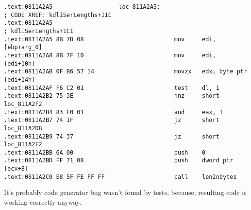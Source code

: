 \documentclass[11pt,a4paper,oneside]{book}
\begin{document}
\begin{lstlisting}
.text:0811A2A5                   loc_811A2A5:                            ; CODE XREF: kdliSerLengths+11C
.text:0811A2A5                                                           ; kdliSerLengths+1C1
.text:0811A2A5 8B 7D 08                          mov     edi, [ebp+arg_0]
.text:0811A2A8 8B 7F 10                          mov     edi, [edi+10h]
.text:0811A2AB 0F B6 57 14                       movzx   edx, byte ptr [edi+14h]
.text:0811A2AF F6 C2 01                          test    dl, 1
.text:0811A2B2 75 3E                             jnz     short loc_811A2F2
.text:0811A2B4 83 E0 01                          and     eax, 1
.text:0811A2B7 74 1F                             jz      short loc_811A2D8
.text:0811A2B9 74 37                             jz      short loc_811A2F2
.text:0811A2BB 6A 00                             push    0
.text:0811A2BD FF 71 08                          push    dword ptr [ecx+8]
.text:0811A2C0 E8 5F FE FF FF                    call    len2nbytes
\end{lstlisting}

{It's probably code generator bug wasn't found by tests, because, 
resulting code is working correctly anyway.}


\end{document}
